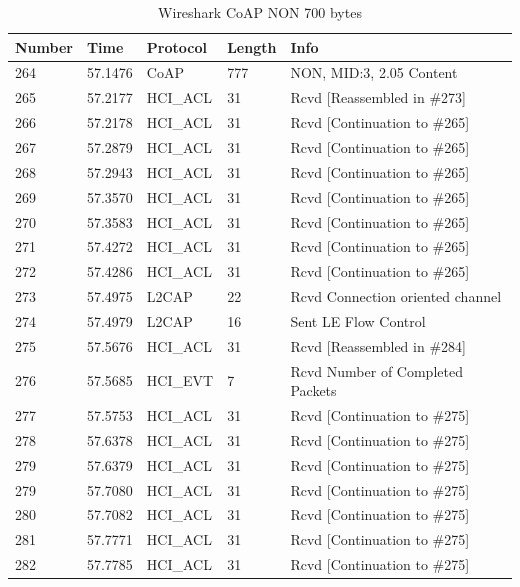 \begin{table}[H]
\small
\centering
\caption{Wireshark CoAP NON 700 bytes}
\label{coapNON700table}
\begin{tabular}{lllll}
\hline
Number & Time    & Protocol & Length & Info                             \\ \hline
264    & 57.1476 & CoAP     & 777    & NON, MID:3, 2.05 Content         \\
265    & 57.2177 & HCI\_ACL & 31     & Rcvd {[}Reassembled in \#273{]}  \\
266    & 57.2178 & HCI\_ACL & 31     & Rcvd {[}Continuation to \#265{]} \\
267    & 57.2879 & HCI\_ACL & 31     & Rcvd {[}Continuation to \#265{]} \\
268    & 57.2943 & HCI\_ACL & 31     & Rcvd {[}Continuation to \#265{]} \\
269    & 57.3570 & HCI\_ACL & 31     & Rcvd {[}Continuation to \#265{]} \\
270    & 57.3583 & HCI\_ACL & 31     & Rcvd {[}Continuation to \#265{]} \\
271    & 57.4272 & HCI\_ACL & 31     & Rcvd {[}Continuation to \#265{]} \\
272    & 57.4286 & HCI\_ACL & 31     & Rcvd {[}Continuation to \#265{]} \\
273    & 57.4975 & L2CAP    & 22     & Rcvd Connection oriented channel \\
274    & 57.4979 & L2CAP    & 16     & Sent LE Flow Control             \\
275    & 57.5676 & HCI\_ACL & 31     & Rcvd {[}Reassembled in \#284{]}  \\
276    & 57.5685 & HCI\_EVT & 7      & Rcvd Number of Completed Packets \\
277    & 57.5753 & HCI\_ACL & 31     & Rcvd {[}Continuation to \#275{]} \\
278    & 57.6378 & HCI\_ACL & 31     & Rcvd {[}Continuation to \#275{]} \\
279    & 57.6379 & HCI\_ACL & 31     & Rcvd {[}Continuation to \#275{]} \\
279    & 57.7080 & HCI\_ACL & 31     & Rcvd {[}Continuation to \#275{]} \\
280    & 57.7082 & HCI\_ACL & 31     & Rcvd {[}Continuation to \#275{]} \\
281    & 57.7771 & HCI\_ACL & 31     & Rcvd {[}Continuation to \#275{]} \\
282    & 57.7785 & HCI\_ACL & 31     & Rcvd {[}Continuation to \#275{]} \\

\end{tabular}
\end{table}
